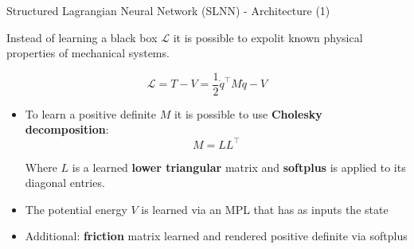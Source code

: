 











\begin{frame} {Structured Lagrangian Neural Network (SLNN) - Architecture (1)}
    
        Instead of learning a black box $\mathcal{L}$ it is possible to expolit known physical properties of mechanical systems. 

        $$ \mathcal{L} = T - V = \frac{1}{2} \dot{q}^{\top} M \dot {q} - V$$
        \begin{itemize}
            \item  To learn a positive definite $M$ it is possible to use \textbf{Cholesky decomposition}: 
                    $$M = L L^{\top}$$

                    Where $L$ is a learned \textbf{lower triangular} matrix and \textbf{softplus} is applied to its diagonal entries. 
            
            \item The potential energy $V$ is learned via an MPL that has as inputs the state
            \item Additional: \textbf{friction} matrix learned and rendered positive definite via softplus

        \end{itemize}
               
\end{frame}

